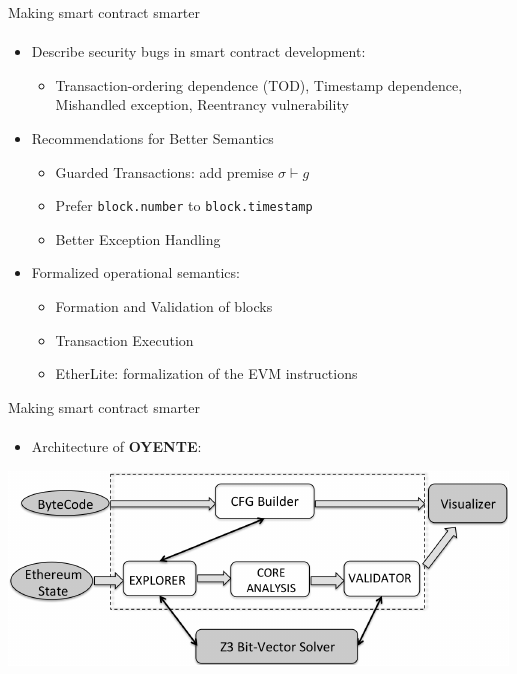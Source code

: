 \begin{frame}{Making smart contract smarter}
    \framesubtitle{\cite{luu2016making}}

    \begin{itemize}
        \item Describe security bugs in smart contract development:
        \begin{itemize}
            \item Transaction-ordering dependence (TOD), Timestamp dependence,
            Mishandled exception, Reentrancy vulnerability
        \end{itemize}
        \item Recommendations for Better Semantics
        \begin{itemize}
            \item Guarded Transactions: add premise $\sigma \vdash g$
            \item Prefer \texttt{block.number} to \texttt{block.timestamp}
            \item Better Exception Handling
        \end{itemize}
        \item Formalized operational semantics:
        \begin{itemize}
            \item Formation and Validation of blocks
            \item Transaction Execution
            \item EtherLite: formalization of the EVM instructions
        \end{itemize}
    \end{itemize}
\end{frame}

\begin{frame}{Making smart contract smarter}
    \framesubtitle{\cite{luu2016making}}
    \begin{itemize}
        \item Architecture of \textbf{OYENTE}:
    \end{itemize}
    \begin{center}
        \includegraphics[width=\textwidth]{./img/oyente-architecture.pdf}
    \end{center}
\end{frame}

